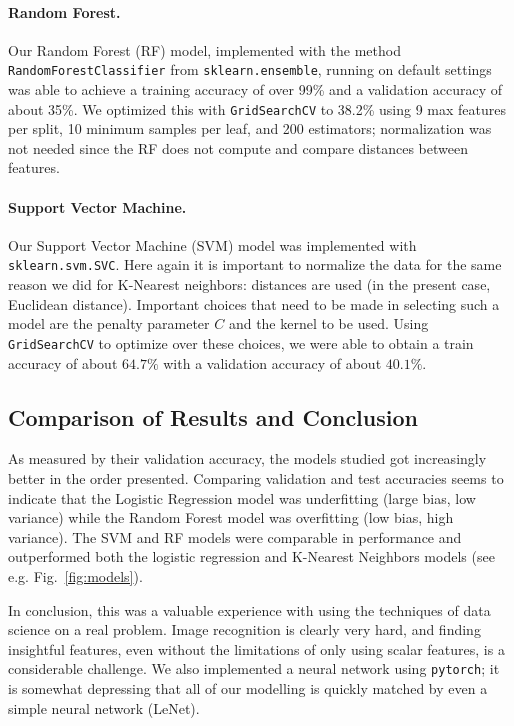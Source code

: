 \documentclass[aps,prl,twocolumn,superscriptaddress]{revtex4-1}
\renewcommand{\=}[1]{\stackrel{#1}{=}} %
\begin{document}
\paragraph{Random Forest.} Our Random Forest (RF) model, implemented with the method \texttt{RandomForestClassifier} from \texttt{sklearn.ensemble}, running on default settings was able to achieve a training accuracy of over 99\% and a validation accuracy of about 35\%. We optimized this with \texttt{GridSearchCV} to 38.2\% using 9 max features per split, 10 minimum samples per leaf, and 200 estimators; normalization was not needed since the RF does not compute and compare distances between features. 

\paragraph{Support Vector Machine.} Our Support Vector Machine (SVM) model was implemented with \texttt{sklearn.svm.SVC}. Here again it is important to normalize the data for the same reason we did for K-Nearest neighbors: distances are used (in the present case, Euclidean distance). Important choices that need to be made in selecting such a model are  the penalty parameter $C$ and the kernel to be used. Using \texttt{GridSearchCV} to optimize over these choices, we were able to obtain a train accuracy of about $64.7\%$ with a validation accuracy of about $40.1\%$.

\subsection{Comparison of Results and Conclusion}

As measured by their validation accuracy, the models studied got increasingly better in the order presented. Comparing validation and test accuracies seems to indicate that the Logistic Regression model was underfitting (large bias, low variance) while the Random Forest model was overfitting (low bias, high variance). The SVM and RF models were comparable in performance and outperformed both the logistic regression and K-Nearest Neighbors models (see e.g. Fig.~\ref{fig:models}). 

In conclusion, this was a valuable experience with using the techniques of data science on a real problem. Image recognition is clearly very hard, and finding insightful features, even without the limitations of only using scalar features, is a considerable challenge. We also implemented a neural network using \texttt{pytorch}; it is somewhat depressing that all of our modelling is quickly matched by even a simple neural network (LeNet). 


%
%
%
\end{document}
